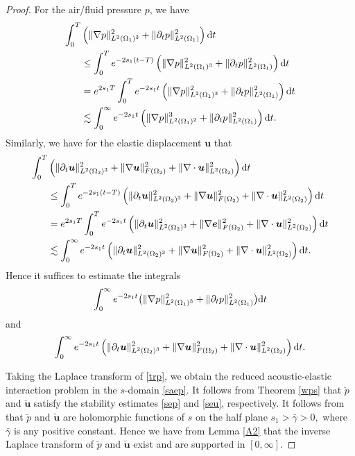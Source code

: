 \documentclass[final,leqno]{siamltex}
\begin{document}
\begin{proof}
For the air/fluid pressure $p$,  we have
\begin{align*}
\int_0^T &\left( \|\nabla p\|_{L^2(\Omega_1)^3}^2+\|\partial_t
p\|^2_{L^2(\Omega_1)}\right) {\rm d} t\\
&\leq  \int_0^T e^{- 2 s_1(t- T)}\left (  \|\nabla p\|_{L^2(\Omega_1)^3}^2+\|\partial_t p\|^2_{L^2(
\Omega_1)}\right) {\rm d} t\\
&= e^{2 s_1 T} \int_0^T e^{-2 s_1 t} \left ( \|\nabla p\|_{L^2(\Omega_1)^3}^2
+\|\partial_t p\|^2_{L^2(\Omega_1)}\right) {\rm d} t\\
&\lesssim  \int_0^{\infty} e^{-2 s_1 t}  \left ( \|\nabla
p\|_{L^2(\Omega_1)^2}^3+\|\partial_t p\|^2_{L^2(\Omega_1)}\right) {\rm d} t.
\end{align*}
Similarly, we have for the elastic displacement $\boldsymbol u$ that
\begin{align*}
\int_0^T &\left(\|\partial_t \boldsymbol u\|^2_{L^2 (\Omega_2)^3}
+\| \nabla \boldsymbol u\|^2_{F (\Omega_2)} +\| \nabla \cdot \boldsymbol
u\|^2_{L^2 (\Omega_2)} \right) {\rm d} t\\
&\leq  \int_0^T e^{-2 s_1 (t-T)} \left( \|\partial_t \boldsymbol u\|^2_{L^2
(\Omega_2)^3} +\| \nabla \boldsymbol u\|^2_{F (\Omega_2)} +\| \nabla \cdot
\boldsymbol u\|^2_{L^2 (\Omega_2)} \right) {\rm d} t\\
&= e^{2s_1 T} \int_0^T e^{-2 s_1 t} \left( \|\partial_t \boldsymbol u\|^2_{L^2
(\Omega_2)^3} +\| \nabla \boldsymbol e\|^2_{F (\Omega_2)} +\| \nabla \cdot
\boldsymbol u\|^2_{L^2 (\Omega_2)} \right) {\rm d} t\\
&\lesssim\int_0^\infty e^{-2 s_1 t} \left( \|\partial_t \boldsymbol u\|^2_{L^2
(\Omega_2)^3} +\| \nabla \boldsymbol u\|^2_{F (\Omega_2)} +\| \nabla \cdot
\boldsymbol u\|^2_{L^2 (\Omega_2)} \right) {\rm d} t.
\end{align*}
Hence it suffices to estimate the integrals
\[
\int_0^{\infty} e^{-2 s_1 t}  \big ( \|\nabla p\|_{L^2(\Omega_1)^3}^2
+\|\partial_t p\|^2_{L^2(\Omega_1)}\big) {\rm d} t
\]
and
\[
\int_0^\infty e^{-2 s_1 t} \left( \|\partial_t \boldsymbol u\|^2_{L^2
(\Omega_2)^3} +\| \nabla \boldsymbol u\|^2_{F (\Omega_2)} +\| \nabla \cdot
\boldsymbol u\|^2_{L^2 (\Omega_2)} \right) {\rm d} t.
\]

Taking the Laplace transform of \eqref{trp}, we obtain the reduced
acoustic-elastic interaction problem in the $s$-domain \eqref{saep}. It follows
from Theorem \ref{wps} that $\breve {p}$ and $\breve {\boldsymbol u}$ satisfy
the stability estimates \eqref{sep} and \eqref{seu}, respectively. It follows
from \cite[Lemma 44.1]{Treves1975} that $\breve p$ and $\breve{\boldsymbol u}$
are holomorphic functions of $s$ on the half plane $s_1 >\bar\gamma>0,$  where
$\bar \gamma$ is any positive constant. Hence we have from Lemma \ref{A2} that
the inverse Laplace transform of $\breve p$ and $\breve{\boldsymbol u}$ exist
and are supported in $[0, \infty].$


\end{proof}
\end{document}
